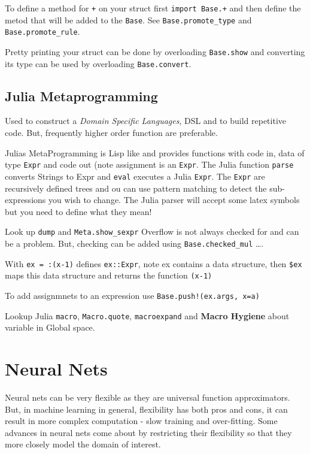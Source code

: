  To define a method for \verb|+| on your struct first \verb|import Base.+| and then define the metod that will be added to the \verb|Base|.  See \verb|Base.promote_type| and \verb|Base.promote_rule|.
 
 Pretty printing your struct can be done by overloading \verb|Base.show| and converting its type can be used by overloading \verb|Base.convert|.
 

 
\subsection{Julia Metaprogramming}
Used to construct a \emph{Domain Specific Languages}, DSL and to build repetitive code. But, frequently higher order function are preferable.


Julias MetaProgramming is Lisp like and provides functions with code in, data of type \verb|Expr| and code out (note assignment is an \verb|Expr|.  The Julia  function  \verb|parse| converts Strings to Expr and \verb|eval| executes a Julia \verb|Expr|.
The \verb|Expr| are recursively defined trees and ou can use pattern matching  to detect the sub-expressions you wish to change. The Julia parser will accept some latex symbols but you need to define what they mean!
 
 
 Look up \verb|dump| and \verb|Meta.show_sexpr|
  Overflow is not always checked for and can be a problem. But, checking can be added using \verb|Base.checked_mul| \ldots. 
  
  With \verb|ex = :(x-1)| defines  \verb|ex::Expr|, note ex contains  a data structure, then     \verb|$ex| maps this data structure and returns  the function \verb|(x-1)|
  
To add assignmnets to an expression use \verb|Base.push!(ex.args, x=a)|  


Lookup Julia \verb|macro|,  \verb|Macro.quote|, \verb|macroexpand|  and {\bf Macro Hygiene} about variable in Global space.

 \section{Neural Nets}
  Neural nets can be very flexible as they are universal function  approximators. But, in machine learning in general,  flexibility has both pros and cons, it can result in more complex computation  - slow  training and  over-fitting. Some advances in neural nets come about by restricting their flexibility so that they more closely model the domain of interest.
  
